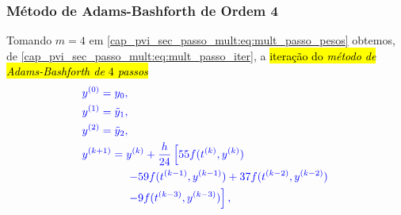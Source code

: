 \subsubsection{Método de Adams-Bashforth de Ordem 4}

Tomando $m=4$ em \eqref{cap_pvi_sec_passo_mult:eq:mult_passo_pesos} obtemos, de \eqref{cap_pvi_sec_passo_mult:eq:mult_passo_iter}, a \hl{iteração do \emph{método de Adams-Bashforth de $4$ passos}}
\begin{equation}\color{blue}\label{cap_pvi_sec_passo_mult:eq:iter_ab4}
  \begin{aligned}
    &y^{(0)} = y_0,\\
    &y^{(1)} = \tilde{y}_1,\\
    &y^{(2)} = \tilde{y}_2,\\
    &y^{(k+1)} = y^{(k)} + \frac{h}{24}\left[55f(t^{(k)},y^{(k)}) \right.\\
    &\qquad\qquad\left. - 59f(t^{(k-1)},y^{(k-1)}) + 37f(t^{(k-2)},y^{(k-2)}) \right. \\
    &\qquad\qquad\left. -9f(t^{(k-3)},y^{(k-3)})\right],
  \end{aligned}
\end{equation}

